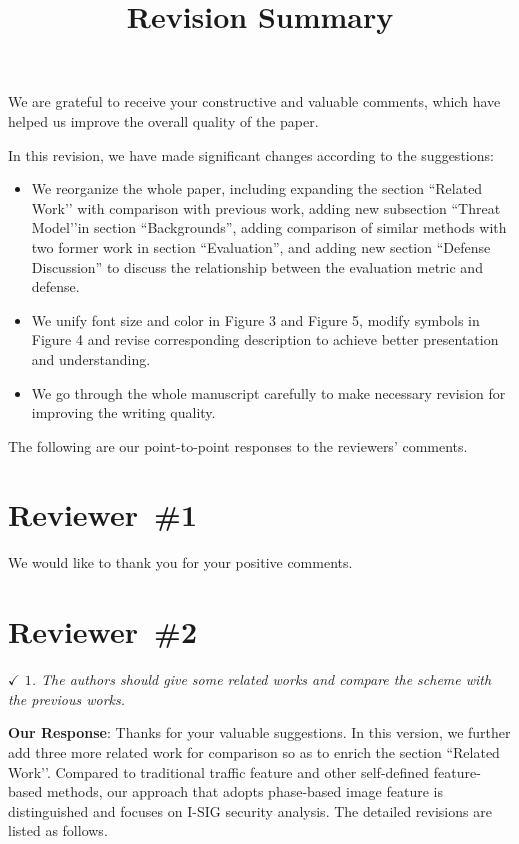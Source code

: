 \documentclass{amsart}
\theoremstyle{definition}
\theoremstyle{remark}
\numberwithin{equation}{section}
\begin{document}
%

\setlength{\parskip}{.5cm}

\title[Revision Summary]
{Revision Summary}%

\maketitle

We are grateful to receive your constructive and valuable comments,
which have helped us improve the overall quality of the paper.

In this revision,
we have made significant changes according to the suggestions:

\begin{itemize}
\item We reorganize the whole paper, including expanding the section ``Related Work’’ with comparison with previous work, adding new subsection ``Threat Model’’in section ``Backgrounds'', adding comparison of similar methods with two former work in section ``Evaluation'', and adding new section ``Defense Discussion'' to discuss the relationship between the evaluation metric and defense.
\item We unify font size and color in Figure 3 and Figure 5, modify symbols in Figure 4 and revise corresponding description to achieve better presentation and understanding.
\item We go through the whole manuscript carefully to make necessary revision for improving the writing quality.
\end{itemize}

The following are our point-to-point responses to the reviewers' comments.

\section*{Reviewer~\#1}

We would like to thank you for your positive comments.


\section*{Reviewer~\#2}

\emph{$\checkmark$ $1$. The authors should give some related works and compare the scheme with the previous works.}

\textbf{Our Response}: Thanks for your valuable suggestions. In this version, we further add three more related work for comparison so as to enrich the section ``Related Work’’. Compared to traditional traffic feature and other self-defined feature-based methods, our approach that adopts phase-based image feature is distinguished and focuses on I-SIG security analysis. The detailed revisions are listed as follows.
\end{document}
